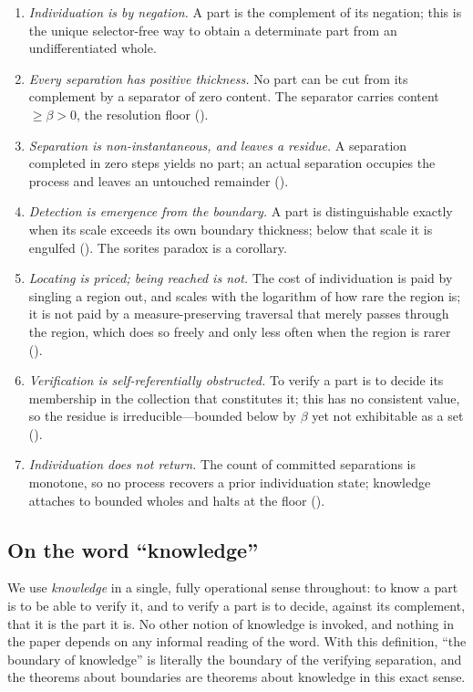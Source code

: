 \documentclass[11pt,a4paper]{article}
\theoremstyle{thmstyle}
\theoremstyle{definition}
\theoremstyle{remark}
\newcommand{\thick}{\beta}
\begin{document}
\begin{enumerate}[label=(\roman*),leftmargin=2.2em]
\item \emph{Individuation is by negation.} A part is the complement of its
negation; this is the unique selector-free way to obtain a determinate part
from an undifferentiated whole.
\item \emph{Every separation has positive thickness.} No part can be cut from
its complement by a separator of zero content. The separator carries content
$\ge\thick>0$, the resolution floor ().
\item \emph{Separation is non-instantaneous, and leaves a residue.} A
separation completed in zero steps yields no part; an actual separation
occupies the process and leaves an untouched remainder
().
\item \emph{Detection is emergence from the boundary.} A part is
distinguishable exactly when its scale exceeds its own boundary thickness;
below that scale it is engulfed (). The sorites paradox is a
corollary.
\item \emph{Locating is priced; being reached is not.} The cost of
individuation is paid by singling a region out, and scales with the logarithm of
how rare the region is; it is not paid by a measure-preserving traversal that
merely passes through the region, which does so freely and only less often when
the region is rarer ().
\item \emph{Verification is self-referentially obstructed.} To verify a part
is to decide its membership in the collection that constitutes it; this has no
consistent value, so the residue is irreducible---bounded below by $\thick$
yet not exhibitable as a set ().
\item \emph{Individuation does not return.} The count of committed separations
is monotone, so no process recovers a prior individuation state; knowledge
attaches to bounded wholes and halts at the floor ().
\end{enumerate}

\subsection{On the word ``knowledge''}

We use \emph{knowledge} in a single, fully operational sense throughout: to
know a part is to be able to verify it, and to verify a part is to decide,
against its complement, that it is the part it is. No other notion of
knowledge is invoked, and nothing in the paper depends on any informal
reading of the word. With this definition, ``the boundary of knowledge'' is
literally the boundary of the verifying separation, and the theorems about
boundaries are theorems about knowledge in this exact sense.
\end{document}
